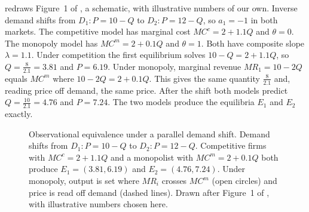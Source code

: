  redraws Figure~1 of \citet{Bresnahan1982}, a schematic, with illustrative numbers of
our own. Inverse demand shifts from
$D_1\colon P = 10 - Q$ to $D_2\colon P = 12 - Q$, so $a_1 = -1$ in both markets. The competitive model has marginal cost
$MC^c = 2 + 1.1Q$ and $\theta = 0$. The monopoly model has $MC^m = 2 + 0.1Q$ and $\theta = 1$. Both have composite slope
$\lambda = 1.1$. Under competition the first equilibrium solves $10 - Q = 2 + 1.1Q$, so $Q = \frac{8}{2.1} = 3.81$ and
$P = 6.19$. Under monopoly, marginal revenue $MR_1 = 10 - 2Q$ equals $MC^m$ where $10 - 2Q = 2 + 0.1Q$. This gives the
same quantity $\frac{8}{2.1}$ and, reading price off demand, the same price. After the shift both models predict
$Q = \frac{10}{2.1} = 4.76$ and $P = 7.24$. The two models produce the equilibria $E_1$ and $E_2$ exactly.

\begin{figure}[htbp]
\centering
{}
\caption[Observational equivalence under a parallel demand shift]{Observational equivalence under a parallel demand
shift. Demand shifts from $D_1\colon P = 10 - Q$ to $D_2\colon P = 12 - Q$. Competitive firms with $MC^c = 2 + 1.1Q$ and a
monopolist with $MC^m = 2 + 0.1Q$ both produce $E_1 = (3.81, 6.19)$ and $E_2 = (4.76, 7.24)$. Under monopoly, output is
set where $MR_i$ crosses $MC^m$ (open circles) and price is read off demand (dashed lines). Drawn after Figure~1 of
\citet{Bresnahan1982}, with illustrative numbers chosen here.}
\label{fig:03-bresnahan-shift}
\end{figure}

